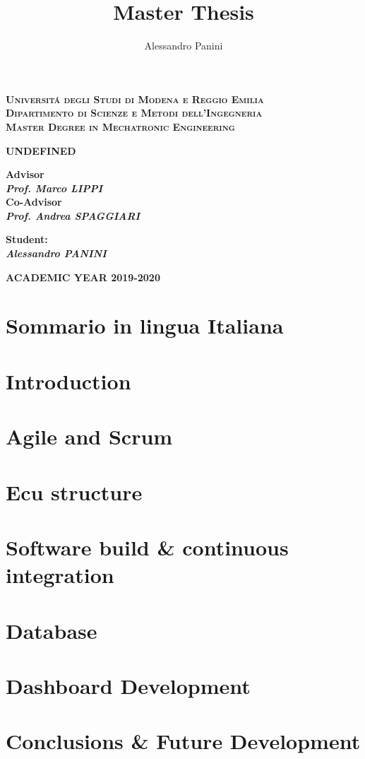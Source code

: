 \documentclass[a4paper,12pt,twoside]{report}
\title{\textbf{Master Thesis}}
\date{}
\author{Alessandro Panini}
\newlength{\drop}%
\newcommand*{\titleSal}%
{
	\begin{center}  
		\begingroup
		{\Large\bfseries\rmfamily\scshape Universit\'a degli Studi di Modena e Reggio Emilia}\\
		{\Large\bfseries\rmfamily\scshape Dipartimento di Scienze e Metodi dell'Ingegneria }\\[\baselineskip]
		\vspace*{1cm}
		\vspace*{\drop}
		{\Large\bfseries\rmfamily\scshape Master Degree in Mechatronic Engineering}\\[\baselineskip]
		\vspace*{\drop}
		
		\vspace*{3cm}
		
		\linespread{3}
        {\LARGE\bfseries\rmfamily UNDEFINED}\\
		\vspace*{4cm}
		
	\end{center}
	\vspace*{2cm}   
	\begin{minipage}[t]{0.5\textwidth}
		\begin{flushleft}
			{\small\bfseries Advisor}\\
			{\bfseries\itshape Prof. Marco LIPPI }\\
			{\small\bfseries Co-Advisor}\\
			{\bfseries\itshape Prof. Andrea SPAGGIARI}
		\end{flushleft}
	\end{minipage}
	\begin{minipage}[t]{0.4\textwidth}
		\begin{flushright} 
			{\bfseries\small Student:}\\
			{\bfseries\itshape Alessandro PANINI}
		\end{flushright}
	\end{minipage}  
	\vfill
	
	{\large\bfseries\rmfamily ACADEMIC YEAR 2019-2020}
	
	\endgroup
}
\begin{document}
	
\titleSal
\pagestyle{plain}

\newcommand*\rot{\multicolumn{1}{R{45}{1em}}}

	
	\newpage
	
	
	\tableofcontents
	\cleardoublepage


\chapter*{}



\chapter*{Sommario in lingua Italiana}

	

\chapter*{Introduction}



\chapter{Agile and Scrum}
	

\chapter{Ecu structure}
	

\chapter{Software build \& continuous integration}
	

% 	

\chapter{Database}



\chapter{Dashboard Development}



\chapter{Conclusions \& Future Development}



\cleardoublepage




\listoffigures
\end{document}
